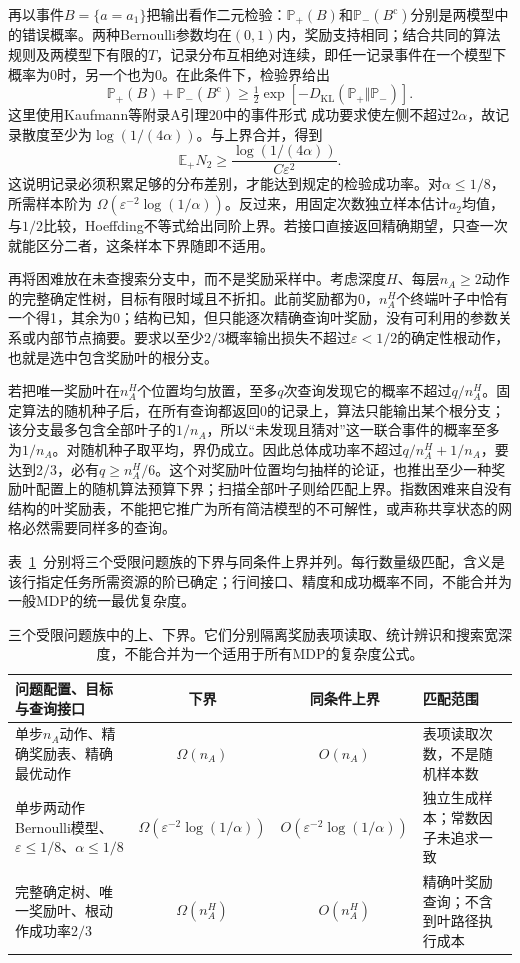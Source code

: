 再以事件$B=\{\widehat a=a_1\}$把输出看作二元检验：$\mathbb P_+(B)$和$\mathbb P_-(B^{\mathrm c})$分别是两模型中的错误概率。两种Bernoulli参数均在$(0,1)$内，奖励支持相同；结合共同的算法规则及两模型下有限的$T$，记录分布互相绝对连续，即任一记录事件在一个模型下概率为0时，另一个也为0。在此条件下，检验界给出
\[
 \mathbb P_+(B)+\mathbb P_-(B^{\mathrm c})
 \geq\tfrac12\exp[-D_{\mathrm{KL}}(\mathbb P_+\Vert\mathbb P_-)].
\]
这里使用Kaufmann等附录A引理20中的事件形式
成功要求使左侧不超过$2\alpha$，故记录散度至少为$\log(1/(4\alpha))$。与上界合并，得到
\[
 \mathbb E_+N_2\geq
 \frac{\log(1/(4\alpha))}{C\varepsilon^2}.
\]
这说明记录必须积累足够的分布差别，才能达到规定的检验成功率。对$\alpha\leq1/8$，所需样本阶为
$\Omega(\varepsilon^{-2}\log(1/\alpha))$。反过来，用固定次数独立样本估计$a_2$均值，与$1/2$比较，Hoeffding不等式给出同阶上界。若接口直接返回精确期望，只查一次就能区分二者，这条样本下界随即不适用。

再将困难放在未查搜索分支中，而不是奖励采样中。考虑深度$H$、每层$n_A\geq2$动作的完整确定性树，目标有限时域且不折扣。此前奖励都为0，$n_A^H$个终端叶子中恰有一个得1，其余为0；结构已知，但只能逐次精确查询叶奖励，没有可利用的参数关系或内部节点摘要。要求以至少$2/3$概率输出损失不超过$\varepsilon<1/2$的确定性根动作，也就是选中包含奖励叶的根分支。

若把唯一奖励叶在$n_A^H$个位置均匀放置，至多$q$次查询发现它的概率不超过$q/n_A^H$。固定算法的随机种子后，在所有查询都返回0的记录上，算法只能输出某个根分支；该分支最多包含全部叶子的$1/n_A$，所以“未发现且猜对”这一联合事件的概率至多为$1/n_A$。对随机种子取平均，界仍成立。因此总体成功率不超过$q/n_A^H+1/n_A$，要达到$2/3$，必有$q\geq n_A^H/6$。这个对奖励叶位置均匀抽样的论证，也推出至少一种奖励叶配置上的随机算法预算下界；扫描全部叶子则给匹配上界。指数困难来自没有结构的叶奖励表，不能把它推广为所有简洁模型的不可解性，或声称共享状态的网格必然需要同样多的查询。

表~\ref{tab:rl-planning-bounds}~分别将三个受限问题族的下界与同条件上界并列。每行数量级匹配，含义是该行指定任务所需资源的阶已确定；行间接口、精度和成功概率不同，不能合并为一般MDP的统一最优复杂度。

\begin{table}[htbp]
 \centering
 \small
 \begin{tabularx}{\linewidth}{@{}>{\raggedright\arraybackslash}Xcc>{\raggedright\arraybackslash}X@{}}
  \toprule
  问题配置、目标与查询接口 & 下界 & 同条件上界 & 匹配范围\\
  \midrule
  单步$n_A$动作、精确奖励表、精确最优动作 & $\Omega(n_A)$ & $O(n_A)$ & 表项读取次数，不是随机样本数\\
  单步两动作Bernoulli模型、$\varepsilon\leq1/8$、$\alpha\leq1/8$ & $\Omega(\varepsilon^{-2}\log(1/\alpha))$ & $O(\varepsilon^{-2}\log(1/\alpha))$ & 独立生成样本；常数因子未追求一致\\
  完整确定树、唯一奖励叶、根动作成功率$2/3$ & $\Omega(n_A^H)$ & $O(n_A^H)$ & 精确叶奖励查询；不含到叶路径执行成本\\
  \bottomrule
 \end{tabularx}
 \caption{三个受限问题族中的上、下界。它们分别隔离奖励表项读取、统计辨识和搜索宽深度，不能合并为一个适用于所有MDP的复杂度公式。}
 \label{tab:rl-planning-bounds}
\end{table}

